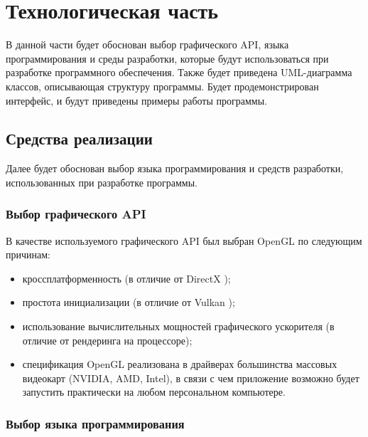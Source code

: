 \section{Технологическая часть}

В данной части будет обоснован выбор графического API, языка программирования и среды разработки, которые будут использоваться при разработке программного обеспечения.
Также будет приведена UML-диаграмма классов, описывающая структуру программы.
Будет продемонстрирован интерфейс, и будут приведены примеры работы программы.

\subsection{Средства реализации}

Далее будет обоснован выбор языка программирования и средств разработки, использованных при разработке программы.

\subsubsection{Выбор графического API}

В качестве используемого графического API был выбран OpenGL \cite{opengl} по следующим причинам:
\begin{itemize}
    \item кроссплатформенность (в отличие от DirectX \cite{dx});
    \item простота инициализации (в отличие от Vulkan \cite{vk});
    \item использование вычислительных мощностей графического ускорителя (в отличие от рендеринга на процессоре);
    \item спецификация OpenGL реализована в драйверах большинства массовых видеокарт (NVIDIA, AMD, Intel), в связи с чем приложение возможно будет запустить практически на любом персональном компьютере.
\end{itemize}

\subsubsection{Выбор языка программирования}

